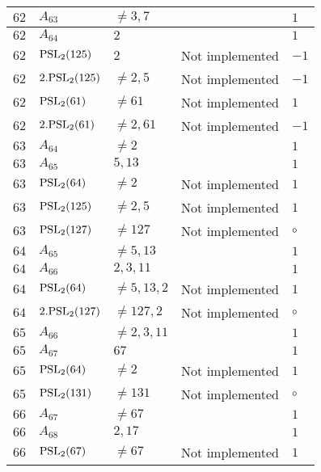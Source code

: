 \documentclass[a4paper, 11pt]{article}
\begin{document}
\begin{longtable}{lllll}
        $ 62 $ & $ A_{63} $ & $ \neq 3, 7 $ & $ ~ $ & $ 1  $ \\ \hline
        $ 62 $ & $ A_{64} $ & $ 2 $ & $ ~ $ & $ 1  $ \\ \hline
        $ 62 $ & $ {\rm PSL}_{2}(125) $ & $ 2 $ & Not implemented & $ -1  $ \\ \hline
        $ 62 $ & $ 2.{\rm PSL}_{2}(125) $ & $ \neq 2, 5 $ & Not implemented & $ -1  $ \\ \hline
        $ 62 $ & $ {\rm PSL}_{2}(61) $ & $ \neq 61 $ & Not implemented & $ 1  $ \\ \hline
        $ 62 $ & $ 2.{\rm PSL}_{2}(61) $ & $ \neq 2, 61 $ & Not implemented & $ -1  $ \\ \hline
        $ 63 $ & $ A_{64} $ & $ \neq 2 $ & $ ~ $ & $ 1  $ \\ \hline
        $ 63 $ & $ A_{65} $ & $ 5, 13 $ & $ ~ $ & $ 1  $ \\ \hline
        $ 63 $ & $ {\rm PSL}_{2}(64) $ & $ \neq 2 $ & Not implemented & $ 1  $ \\ \hline
        $ 63 $ & $ {\rm PSL}_{2}(125) $ & $ \neq 2, 5 $ & Not implemented & $ 1  $ \\ \hline
        $ 63 $ & $ {\rm PSL}_{2}(127) $ & $ \neq 127 $ & Not implemented & $\circ$ \\ \hline
        $ 64 $ & $ A_{65} $ & $ \neq 5, 13 $ & $ ~ $ & $ 1  $ \\ \hline
        $ 64 $ & $ A_{66} $ & $ 2, 3, 11 $ & $ ~ $ & $ 1  $ \\ \hline
        $ 64 $ & $ {\rm PSL}_{2}(64) $ & $ \neq 5, 13, 2 $ & Not implemented & $ 1  $ \\ \hline
        $ 64 $ & $ 2.{\rm PSL}_{2}(127) $ & $ \neq 127, 2 $ & Not implemented & $\circ$ \\ \hline
        $ 65 $ & $ A_{66} $ & $ \neq 2, 3, 11 $ & $ ~ $ & $ 1  $ \\ \hline
        $ 65 $ & $ A_{67} $ & $ 67 $ & $ ~ $ & $ 1  $ \\ \hline
        $ 65 $ & $ {\rm PSL}_{2}(64) $ & $ \neq 2 $ & Not implemented & $ 1  $ \\ \hline
        $ 65 $ & $ {\rm PSL}_{2}(131) $ & $ \neq 131 $ & Not implemented & $\circ$ \\ \hline
        $ 66 $ & $ A_{67} $ & $ \neq 67 $ & $ ~ $ & $ 1  $ \\ \hline
        $ 66 $ & $ A_{68} $ & $ 2, 17 $ & $ ~ $ & $ 1  $ \\ \hline
        $ 66 $ & $ {\rm PSL}_{2}(67) $ & $ \neq 67 $ & Not implemented & $ 1  $ \\ \hline

\end{longtable}
\end{document}
